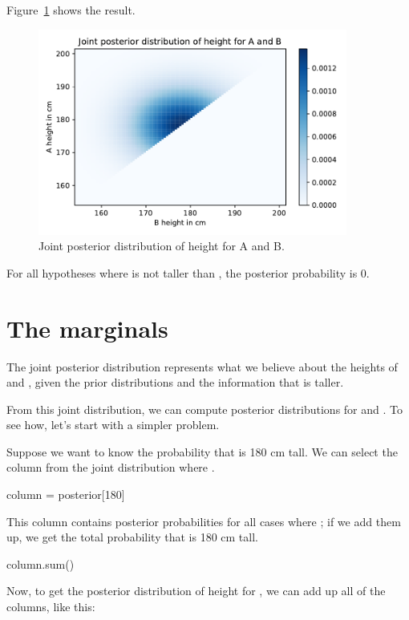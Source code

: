 \documentclass[12pt]{book}
\theoremstyle{exercise}
\begin{document}
Figure~\ref{fig09-03} shows the result.

\begin{figure}
\centerline{\includegraphics[width=4in]{figs/fig09-03.pdf}}
\caption{Joint posterior distribution of height for A and B.}
\label{fig09-03}
\end{figure}

For all hypotheses where  is not taller than , the posterior probability is 0. 


\section{The marginals}
\label{marginals}

The joint posterior distribution represents what we believe about the heights of  and , given the prior distributions and the information that  is taller.

From this joint distribution, we can compute posterior distributions for  and .  To see how, let's start with a simpler problem.

Suppose we want to know the probability that  is 180 cm tall.  We can select the column from the joint distribution where .

\begin{code}
column = posterior[180]
\end{code}

This column contains posterior probabilities for all cases where ; if we add them up, we get the total probability that  is 180 cm tall.

\begin{code}
column.sum()
\end{code}

Now, to get the posterior distribution of height for , we can add up all of the columns, like this:
\end{document}
